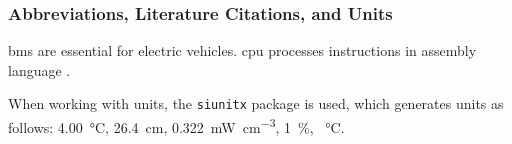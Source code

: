 \begin{frame}
	\frametitle{Abbreviations, Literature Citations, and Units}
	
	\gls{bms} are essential for electric vehicles.
	\gls{cpu} processes instructions in assembly language \cite{nuclearfissionuranium235, Kropczyk2026, Jayabal2024}.
	
	\vspace{4mm}
	
	When working with units, the \texttt{siunitx} package is used, which generates units as follows:
	\SI{4.00}{\celsius}, \SI{26.4}{\centi\metre}, \SI{0.322}{\milli\watt\per\cubic\centi\metre}, \SI{1}{\percent}, \SI{}{\celsius}.
	
\end{frame}
